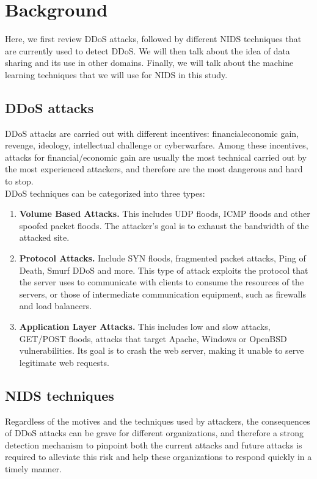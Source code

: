 \section{Background}
\label{sec:background}
\begin{background}
Here, we first review DDoS attacks, followed by different NIDS techniques that are currently used to detect DDoS. We will then talk about the idea of data sharing and its use in other domains. Finally, we will talk about the machine learning techniques that we will use for NIDS in this study.
\subsection{DDoS attacks}
DDoS attacks are carried out with different incentives: financial\/economic gain, revenge, ideology, intellectual challenge or cyberwarfare. Among these incentives, attacks for financial/economic gain are usually the most technical carried out by the most experienced attackers, and therefore are the most dangerous and hard to stop.\\
DDoS techniques can be categorized into three types:
\begin{enumerate}
    \item \textbf{Volume Based Attacks.} This includes UDP floods, ICMP floods and other spoofed packet floods. The attacker's goal is to exhaust the bandwidth of the attacked site.
    \item \textbf{Protocol Attacks.} Include SYN floods, fragmented packet attacks, Ping of Death, Smurf DDoS and more. This type of attack exploits the protocol that the server uses to communicate with clients to consume the resources of the servers, or those of intermediate communication equipment, such as firewalls and load balancers.
    \item \textbf{Application Layer Attacks.} This includes low and slow attacks, GET/POST floods, attacks that target Apache, Windows or OpenBSD vulnerabilities. Its goal is to crash the web server, making it unable to serve legitimate web requests.
\end{enumerate}

\subsection{NIDS techniques}
Regardless of the motives and the techniques used by attackers, the consequences of DDoS attacks can be grave for different organizations, and therefore a strong detection mechanism to pinpoint both the current attacks and future attacks is required to alleviate this risk and help these organizations to respond quickly in a timely manner. 


\end{background}
